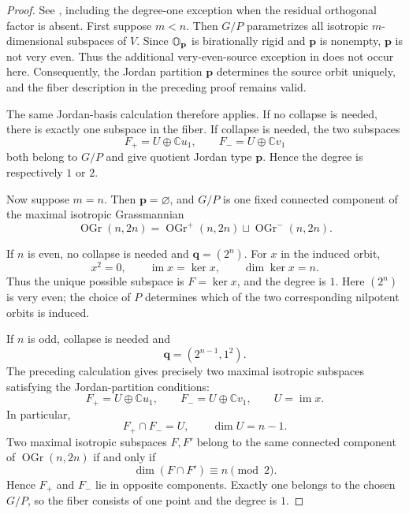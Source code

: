 \begin{proof}
  See \cite[Claims~3.6.1--3.6.2]{Namikawa2022Cover}, including
  the degree-one exception when the residual orthogonal factor is absent.
  First suppose $m<n$. Then $G/P$ parametrizes all
  isotropic $m$-dimensional subspaces of $V$.
  Since $\mathbb{O}_{\mathbf p}$ is birationally rigid and
  $\mathbf p$ is nonempty, $\mathbf p$ is not very even.
  Thus the additional very-even-source exception in
  \cite[Claim~3.6.2]{Namikawa2022Cover} does not occur here.
  Consequently, the Jordan partition $\mathbf p$
  determines the source orbit uniquely, and the fiber
  description in the preceding proof remains valid.

  The same Jordan-basis calculation therefore applies.
  If no collapse is needed, there is exactly one
  subspace in the fiber. If collapse is needed, the
  two subspaces
  \[
    F_+=U\oplus\mathbb C u_1,
    \qquad
    F_-=U\oplus\mathbb C v_1
  \]
  both belong to $G/P$ and give quotient Jordan type
  $\mathbf p$. Hence the degree is respectively
  $1$ or $2$.

  Now suppose $m=n$. Then $\mathbf p=\varnothing$,
  and $G/P$ is one fixed connected component of
  the maximal isotropic Grassmannian
  \[
    \operatorname{OGr}(n,2n)
    =
    \operatorname{OGr}^{+}(n,2n)
    \sqcup
    \operatorname{OGr}^{-}(n,2n).
  \]

  If $n$ is even, no collapse is needed and
  $\mathbf q=(2^n)$.
  For $x$ in the induced orbit,
  \[
    x^2=0,\qquad
    \operatorname{im}x=\ker x,\qquad
    \dim\ker x=n.
  \]
  Thus the unique possible subspace is
  $F=\ker x$, and the degree is $1$.
  Here $(2^n)$ is very even; the choice of $P$
  determines which of the two corresponding
  nilpotent orbits is induced.

  If $n$ is odd, collapse is needed and
  \[
    \mathbf q=(2^{n-1},1^2).
  \]
  The preceding calculation gives precisely two
  maximal isotropic subspaces satisfying the
  Jordan-partition conditions:
  \[
    F_+=U\oplus\mathbb C u_1,
    \qquad
    F_-=U\oplus\mathbb C v_1,
    \qquad
    U=\operatorname{im}x.
  \]
  In particular,
  \[
    F_+\cap F_-=U,\qquad \dim U=n-1.
  \]
  Two maximal isotropic subspaces $F,F'$ belong to
  the same connected component of
  $\operatorname{OGr}(n,2n)$ if and only if
  \[
    \dim(F\cap F')\equiv n\pmod 2.
  \]
  Hence $F_+$ and $F_-$ lie in opposite components.
  Exactly one belongs to the chosen $G/P$, so the
  fiber consists of one point and the degree is $1$.
\end{proof}


